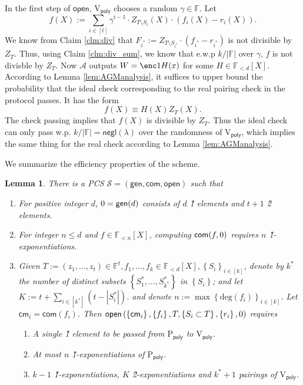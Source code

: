 \documentclass[11pt]{article} %
\newcommand{\F}{\ensuremath{\mathbb F}\xspace}
\newcommand{\adv}{\ensuremath{\mathcal A}\xspace}
\newcommand{\com}{\ensuremath{\mathsf{com}}\xspace}
\newcommand{\cm}{\ensuremath{\mathsf{cm}}\xspace}
\newcommand{\open}{\ensuremath{\mathsf{open}}\xspace}
\renewcommand{\deg}{\ensuremath{\mathrm{deg}}\xspace}
\newcommand{\negl}{\ensuremath{\mathsf{negl}(\lambda)}\xspace}
\newcommand{\defeq}{:=}
\newcommand{\sett}[2]{\ensuremath{\set{#1}_{#2}}\xspace}
\newcommand{\gen}{\ensuremath{\mathsf{gen}}\xspace}
\newcommand{\prvpoly}{\ensuremath{\mathrm{P_{\mathsf{poly}}}}\xspace}
\newcommand{\verpoly}{\ensuremath{\mathrm{V_{\mathsf{poly}}}}\xspace}
\newcommand{\set}[1]{\ensuremath{\left\{#1\right\}}\xspace}
\newcommand{\polysofdeg}[1]{\ensuremath{\F_{< #1}[X]}\xspace}
\newcommand{\PCscheme}{\ensuremath{\mathscr{S}}\xspace}
\newcommand{\sumi}[1]{\sum_{i\in[#1]}}
\newtheorem{lemma}{Lemma}[section]
\begin{document}
\begin{enumerate}
 In the first step of \open, \verpoly chooses a random $\gamma \in \F$.
 Let
 \[f(X)\defeq \sum_{i\in [t]} \gamma^{i-1} \cdot Z_{T\setminus S_i}(X)\cdot (f_i(X)-r_i(X)).\]
 We know from Claim \ref{clm:div} that $F_{i^*} \defeq  Z_{T\setminus S_{i^*}}\cdot (f_{i^*}-r_{i^*})$ is not divisible by $Z_T$. Thus, using Claim \ref{clm:div_sum}, we know that e.w.p $k/|\F|$ over $\gamma$, $f$ is not divisble by $Z_T$.
  Now \adv outputs $W=\enc1{H(x)}$ for some $H\in\polysofdeg{d}$.
 According to Lemma \ref{lem:AGManalysis}, it suffices to upper bound the probability that the ideal check corresponding to the real pairing check in the protocol passes. It has the form
 \[f(X) \equiv H(X)Z_T(X).\]
 The check passing implies that
 $f(X)$ is divisible by $Z_T$. Thus the ideal check can only pass w.p. $k/|\F|= \negl$ over the randomness of \verpoly, which implies the same thing for the real check according to Lemma \ref{lem:AGManalysis}.


 \end{enumerate}



 We summarize the efficiency properties of the scheme.

 \begin{lemma}\label{lem:multikate}
  There is a PCS $\PCscheme=(\gen,\com,\open)$ such that
  \begin{enumerate}
\item For positive integer $d$, $\srs0=\gen(d)$ consists of $d$ \G1 elements and $t+1$ \G2 elements.
  \item For integer $n\leq d$ and $f\in \polysofdeg{n}$, computing $\com(f,\srs0)$ requires $n$ \G1-exponentiations.
   \item Given $T \defeq (z_1,\ldots,z_t)\in \F^t, f_1,\ldots, f_k \in \polysofdeg{d}, \sett{S_i}{i\in [k]}$, denote by $k^*$ the number of distinct subsets  \set{S^*_1,\ldots,S^*_{k^*}} in \set{S_i}; and
   let $K\defeq t+ \sumi {k^*}\left( t-|S^*_i|\right)$.
   and denote $n \defeq \max\sett{\deg(f_i)}{i\in [k]}$.
   Let $\cm_i = \com(f_i)$.
   Then $\open\left(\set{\cm_i},\set{f_i},T,\set{S_i\subset T},\set{r_i},\srs0 \right)$ requires
   \begin{enumerate}
    \item A single \G1 element to be passed from \prvpoly to \verpoly.
    \item At most $n$ \G1-exponentiations of \prvpoly.
    \item $k-1$ \G1-exponentiations, $K$ \G2-exponentiations and $k^*+1$ pairings of \verpoly.
   \end{enumerate}
\end{enumerate}

\end{lemma}
\end{document}
